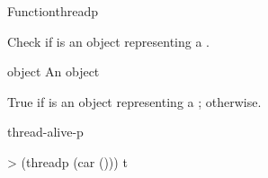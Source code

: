 
\begin{functiondoc}{Function}{threadp}{ \returns{}
    }
%

\fnsyntax

\fnpurpose Check if  is an object representing a
.

\fnpackage {}

\fnmodule {}

\fnargs
\begin{args}{object}
\arg[object] An object
\end{args}

\fnreturns True if  is an object representing a 
; \nil{} otherwise.

\begin{alsos}{thread-alive-p}
\end{alsos}

%
\fnexample
%
\W\supp
\begin{example}
> (threadp (car ()))
t
\end{example}

\end{functiondoc}


